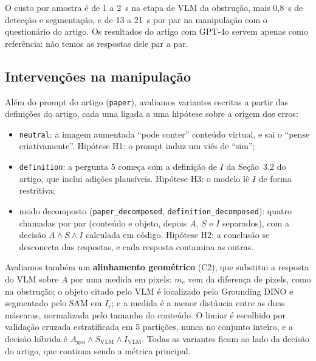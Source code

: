 \documentclass[journal,onecolumn]{IEEEtran}
\newcommand{\Ir}{I_r}
\begin{document}
O custo por amostra é de 1 a 2~s na etapa de VLM da obstrução, mais 0,8~s de detecção e segmentação, e
de 13 a 21~s por par na manipulação com o questionário do artigo. Os resultados do artigo com GPT-4o
servem apenas como referência: não temos as respostas dele par a par.

\subsection{Intervenções na manipulação}
\label{sec:intervencoes}
Além do prompt do artigo (\texttt{paper}), avaliamos variantes escritas a partir das definições do
artigo, cada uma ligada a uma hipótese sobre a origem dos erros:
\begin{itemize}
\item \texttt{neutral}: a imagem aumentada ``pode conter'' conteúdo virtual, e sai o ``pense
  criativamente''. Hipótese H1: o prompt induz um viés de ``sim'';
\item \texttt{definition}: a pergunta 5 começa com a definição de $I$ da Seção~3.2 do artigo, que
  inclui adições plausíveis. Hipótese H3: o modelo lê $I$ de forma restritiva;
\item modo decomposto (\texttt{paper\_decomposed}, \texttt{definition\_decomposed}): quatro chamadas
  por par (conteúdo e objeto, depois $A$, $S$ e $I$ separados), com a decisão $A\wedge S\wedge I$
  calculada em código. Hipótese H2: a conclusão se desconecta das respostas, e cada resposta
  contamina as outras.
\end{itemize}
Avaliamos também um \textbf{alinhamento geométrico} (C2), que substitui a resposta do VLM sobre $A$ por
uma medida em pixels: $m_c$ vem da diferença de pixels, como na obstrução; o objeto citado pelo VLM é
localizado pelo Grounding DINO e segmentado pelo SAM em $\Ir$; e a medida é a menor distância entre as
duas máscaras, normalizada pelo tamanho do conteúdo. O limiar é escolhido por validação cruzada
estratificada em 5 partições, nunca no conjunto inteiro, e a decisão híbrida é
$A_{\text{geo}}\wedge S_{\text{VLM}}\wedge I_{\text{VLM}}$. Todas as variantes ficam ao lado da decisão
do artigo, que continua sendo a métrica principal.
\end{document}
